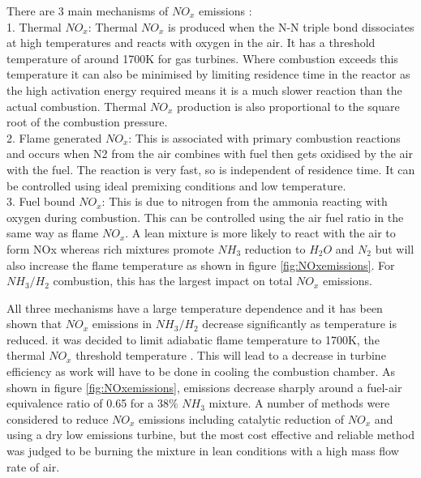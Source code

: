 \documentclass[11pt, oneside]{article}
\begin{document}
There are 3 main mechanisms of $NO_x$ emissions \cite{netl}:\\ 
1. Thermal $NO_x$: Thermal $NO_x$ is produced when the N-N triple bond dissociates at high temperatures and reacts with oxygen in the air. It has a threshold temperature of around 1700K for gas turbines. Where combustion exceeds this temperature it can also be minimised by limiting residence time in the reactor as the high activation energy required means it is a much slower reaction than the actual combustion. Thermal $NO_x$ production is also proportional to the square root of the combustion pressure.
\\2. Flame generated $NO_x$: This is associated with primary combustion reactions and occurs when N2 from the air combines with fuel then gets oxidised by the air with the fuel. The reaction is very fast, so is independent of residence time. It can be controlled using ideal premixing conditions and low temperature.
\\3. Fuel bound $NO_x$: This is due to nitrogen from the ammonia reacting with oxygen during combustion. This can be controlled using the air fuel ratio in the same way as flame $NO_x$. A lean mixture is more likely to react with the air to form NOx whereas rich mixtures promote $NH_3$ reduction to $H_2O$ and $N_2$ but will also increase the flame temperature as shown in figure \ref{fig:NOxemissions}. For $NH_3/H_2$ combustion, this has the largest impact on total $NO_x$ emissions. \cite{junLi}
  
All three mechanisms have a large temperature dependence and it has been shown that $NO_x$ emissions in $NH_3/H_2$ decrease significantly as temperature is reduced. it was decided to limit adiabatic flame temperature to 1700K, the thermal $NO_x$ threshold temperature \cite{netl}. This will lead to a decrease in turbine efficiency as work will have to be done in cooling the combustion chamber. As shown in figure \ref{fig:NOxemissions}, emissions decrease sharply around a fuel-air equivalence ratio of 0.65 for a $38\%$ $NH_3$ mixture. A number of methods were considered to reduce $NO_x$ emissions including catalytic reduction of $NO_x$ and using a dry low emissions turbine, but the most cost effective and reliable method was judged to be burning the mixture in lean conditions with a high mass flow rate of air.
\end{document}
